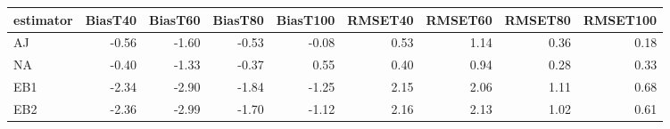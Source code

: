 \begin{table}[ht]
\centering
\begin{tabular}{lrrrrrrrr}
  \toprule
estimator & BiasT40 & BiasT60 & BiasT80 & BiasT100 & RMSET40 & RMSET60 & RMSET80 & RMSET100 \\ 
  \midrule
AJ & -0.56 & -1.60 & -0.53 & -0.08 & 0.53 & 1.14 & 0.36 & 0.18 \\ 
  NA & -0.40 & -1.33 & -0.37 & 0.55 & 0.40 & 0.94 & 0.28 & 0.33 \\ 
  EB1 & -2.34 & -2.90 & -1.84 & -1.25 & 2.15 & 2.06 & 1.11 & 0.68 \\ 
  EB2 & -2.36 & -2.99 & -1.70 & -1.12 & 2.16 & 2.13 & 1.02 & 0.61 \\ 
   \bottomrule
\end{tabular}
\end{table}

